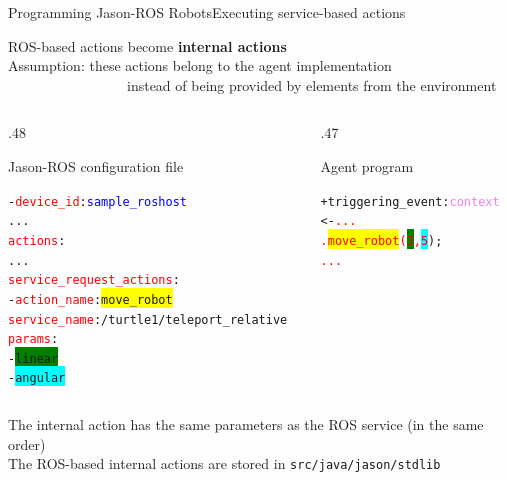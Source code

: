 \documentclass[compress]{beamer}
\newcommand{\yamlkey}[1]{\textcolor{red}{\texttt{#1}}}
\newcommand{\yamlvalue}[1]{\textcolor{blue}{\texttt{#1}}}
\newcommand{\planhead}[1]{\textcolor{indiagreen}{#1}}
\newcommand{\instruction}[1]{\textcolor{red}{#1}}
\newcommand{\belief}[1]{\textcolor{violet}{#1}}
\begin{document}
\begin{frame}[fragile]{Programming Jason-ROS Robots}{Executing service-based actions}{}

\footnotesize

ROS-based actions become {\bf internal actions}\\


\scriptsize 
Assumption: these actions belong to the agent implementation\\


\vspace{-.4cm}
\ \ \ \ \ \ \ \ \ \ \ \ \ \ \ \ \ {\ssmall instead of being provided by elements from the environment}



\begin{columns}

\begin{column}{.48\textwidth}

\begin{block}{{\ssmall Jason-ROS configuration file}}


\scriptsize
\begin{alltt}\ssmall
- \yamlkey{device_id}: \yamlvalue{sample_roshost}
     ...
  \yamlkey{actions}:        
        ...
     \yamlkey{service_request_actions}:
        - \yamlkey{action_name}: \colorbox{yellow}{move_robot}
          \yamlkey{service_name}: /turtle1/teleport_relative
          \yamlkey{params}:
             - \colorbox{green}{linear}
             - \colorbox{cyan}{angular}
\end{alltt}
    
\end{block}  
\end{column}

\hspace{-20pt} %

\begin{column}{.47\textwidth}

\begin{block}{{\ssmall Agent program}}

\begin{alltt}\ssmall
 
   

 +\planhead{triggering\_event} : \belief{context}
    <- \instruction{...}
       \instruction{.\colorbox{yellow}{move_robot}(\colorbox{green}{3}, \colorbox{cyan}{5}});
       \instruction{...}
       
       
       
       
       
\end{alltt}
\end{block}
 \end{column}
\end{columns} 

 {\tiny The internal action has the same parameters as the ROS service (in the same order)}\\ 
 
 {\tiny The ROS-based internal actions are stored in \texttt{src/java/jason/stdlib}}
 
\end{frame}
\end{document}
